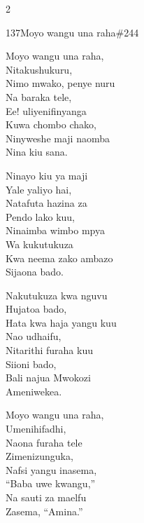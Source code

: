 \documentclass{article}
\begin{document}
\begin{multicols}{2}
\begin{hymn}{137}{Moyo wangu una raha}{\#244}
\begin{stanza}
Moyo wangu una raha,\\
Nitakushukuru,\\
Nimo mwako, penye nuru\\
Na baraka tele,\\
Ee! uliyenifinyanga\\
Kuwa chombo chako,\\
Ninyweshe maji naomba\\
Nina kiu sana.
\end{stanza}
\begin{stanza}
Ninayo kiu ya maji\\
Yale yaliyo hai,\\
Natafuta hazina za\\
Pendo lako kuu,\\
Ninaimba wimbo mpya\\
Wa kukutukuza\\
Kwa neema zako ambazo\\
Sijaona bado.
\end{stanza}
\begin{stanza}
Nakutukuza kwa nguvu\\
Hujatoa bado,\\
Hata kwa haja yangu kuu\\
Nao udhaifu,\\
Nitarithi furaha kuu\\
Siioni bado,\\
Bali najua Mwokozi\\
Ameniwekea.
\end{stanza}
\begin{stanza}
Moyo wangu una raha,\\
Umenihifadhi,\\
Naona furaha tele\\
Zimenizunguka,\\
Nafsi yangu inasema,\\
``Baba uwe kwangu,''\\
Na sauti za maelfu\\
Zasema, ``Amina.''
\end{stanza}
\end{hymn}


\end{multicols}
\end{document}
